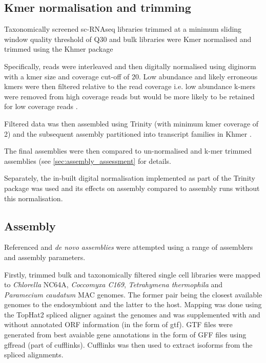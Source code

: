 \subsection{Kmer normalisation and trimming}

Taxonomically screened sc-RNAseq libraries trimmed at a minimum sliding window quality
threshold of Q30 and bulk libraries were Kmer normalised and trimmed using the Khmer package \citep{Crusoe2015}

Specifically, reads were interleaved \citep{Doring2008} and then digitally normalised using diginorm \citep{Brown2012}
with a kmer size and coverage cut-off of 20.  Low abundance and likely erroneous
kmers were then filtered relative to the read coverage i.e. low abundance k-mers were removed
from high coverage reads but would be more likely to be retained for low coverage reads \citep{Zhang2015,Zhang2014}.  

Filtered data was then assembled using Trinity (with minimum kmer coverage of 2) 
and the subsequent assembly partitioned into transcript families in Khmer \citep{Pell2012}.

The final assemblies were then compared to un-normalised and k-mer trimmed assemblies 
(see \ref{sec:assembly_assessment} for details.

Separately, the in-built digital normalisation implemented as part of the Trinity package
was used and its effects on assembly compared to assembly runs without this normalisation.


\subsection{Assembly}

Referenced and \textit{de novo assemblies} were attempted using a range of assemblers
and assembly parameters.

Firstly, trimmed bulk and taxonomically filtered single cell libraries
were mapped to \textit{Chlorella} NC64A, \textit{Coccomyxa C169}, 
\textit{Tetrahymena thermophila} and \textit{Paramecium caudatum} MAC genomes.
The former pair being the closest available genomes to the endosymbiont and the latter to the host.
Mapping was done using the TopHat2 spliced aligner \citep{Kim2013} against
the genomes and was supplemented with and without annotated ORF information (in the form of gtf).
GTF files were generated from best avaiable gene annotations in the form of GFF files using gffread (part of
cufflinks).
Cufflinks \citep{Trapnell2011} was then used to extract isoforms from the spliced alignments.

